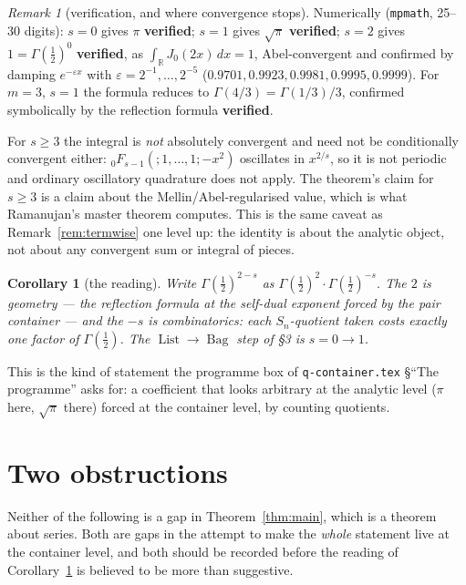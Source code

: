 \documentclass[11pt,a4paper]{article}
\newtheorem{corollary}[theorem]{Corollary}
\theoremstyle{definition}
\theoremstyle{remark}
\newtheorem{remark}[theorem]{Remark}
\newcommand{\RR}{\mathbb{R}}
\DeclareMathOperator{\Bag}{Bag}
\DeclareMathOperator{\List}{List}
\newcommand{\OK}{\textcolor{okgreen}{\textbf{verified}}}
\begin{document}
\begin{remark}[verification, and where convergence stops]\label{rem:verify}
Numerically (\texttt{mpmath}, 25--30 digits): $s = 0$ gives $\pi$ \OK;
$s = 1$ gives $\sqrt{\pi}$ \OK; $s = 2$ gives $1 = \Gamma(\tfrac12)^0$ \OK, as
$\int_\RR J_0(2x)\,dx = 1$, Abel-convergent and confirmed by damping
$e^{-\varepsilon x}$ with $\varepsilon = 2^{-1},\dots,2^{-5}$
($0.9701, 0.9923, 0.9981, 0.9995, 0.9999$). For $m = 3$, $s = 1$ the formula reduces
to $\Gamma(4/3) = \Gamma(1/3)/3$, confirmed symbolically by the reflection formula \OK.

For $s \ge 3$ the integral is \emph{not} absolutely convergent and need not be
conditionally convergent either: ${}_0F_{s-1}(;1,\dots,1;-x^2)$ oscillates in
$x^{2/s}$, so it is not periodic and ordinary oscillatory quadrature does not apply.
The theorem's claim for $s \ge 3$ is a claim about the Mellin/Abel-regularised value,
which is what Ramanujan's master theorem computes. This is the same caveat as
Remark~\ref{rem:termwise} one level up: the identity is about the analytic object,
not about any convergent sum or integral of pieces.
\end{remark}

\begin{corollary}[the reading]\label{cor:reading}
Write $\Gamma(\tfrac12)^{2-s}$ as $\Gamma(\tfrac12)^2 \cdot \Gamma(\tfrac12)^{-s}$. The
$2$ is geometry --- the reflection formula at the self-dual exponent forced by the
pair container --- and the $-s$ is combinatorics: \emph{each $S_n$-quotient taken
costs exactly one factor of $\Gamma(\tfrac12)$.} The $\List \to \Bag$ step of \S3 is
$s = 0 \to 1$.
\end{corollary}

This is the kind of statement the programme box of \texttt{q-container.tex} \S``The
programme'' asks for: a coefficient that looks arbitrary at the analytic level
($\pi$ here, $\sqrt{\pi}$ there) forced at the container level, by counting
quotients.

\section{Two obstructions}

Neither of the following is a gap in Theorem~\ref{thm:main}, which is a theorem about
series. Both are gaps in the attempt to make the \emph{whole} statement live at the
container level, and both should be recorded before the reading of
Corollary~\ref{cor:reading} is believed to be more than suggestive.
\end{document}
